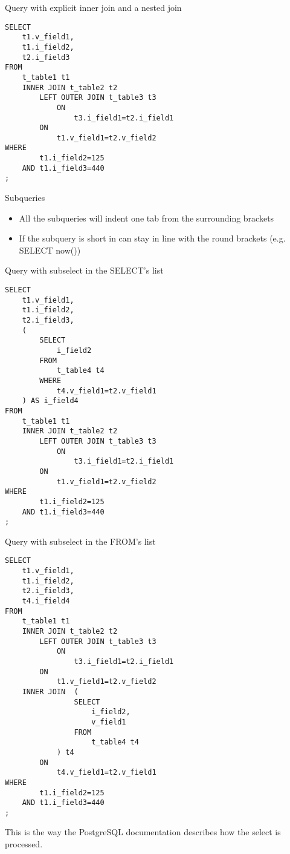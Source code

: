 Query with explicit inner join and a nested join
\begin{lstlisting}[style=pgsql]
SELECT 
	t1.v_field1,
	t1.i_field2,
	t2.i_field3 
FROM 
	t_table1 t1 
	INNER JOIN t_table2 t2
		LEFT OUTER JOIN t_table3 t3
			ON
				t3.i_field1=t2.i_field1
		ON
			t1.v_field1=t2.v_field2
WHERE 
		t1.i_field2=125
	AND	t1.i_field3=440
;
\end{lstlisting}

Subqueries
\begin{itemize}
 \item All the subqueries will indent one tab from the surrounding brackets
 \item If the subquery is short in can stay in line with the round brackets (e.g. SELECT now())
\end{itemize}


Query with subselect in the SELECT's list
\begin{lstlisting}[style=pgsql]
SELECT 
	t1.v_field1,
	t1.i_field2,
	t2.i_field3,
	(
		SELECT 
			i_field2
		FROM
			t_table4 t4
		WHERE
			t4.v_field1=t2.v_field1
	) AS i_field4
FROM 
	t_table1 t1 
	INNER JOIN t_table2 t2
		LEFT OUTER JOIN t_table3 t3
			ON
				t3.i_field1=t2.i_field1
		ON
			t1.v_field1=t2.v_field2
WHERE 
		t1.i_field2=125
	AND	t1.i_field3=440
;
\end{lstlisting}

Query with subselect in the FROM's list
\begin{lstlisting}[style=pgsql]
SELECT 
	t1.v_field1,
	t1.i_field2,
	t2.i_field3,
	t4.i_field4
FROM 
	t_table1 t1 
	INNER JOIN t_table2 t2
		LEFT OUTER JOIN t_table3 t3
			ON
				t3.i_field1=t2.i_field1
		ON
			t1.v_field1=t2.v_field2
	INNER JOIN 	(
				SELECT 
					i_field2,
					v_field1
				FROM
					t_table4 t4
			) t4
		ON
			t4.v_field1=t2.v_field1
WHERE 
		t1.i_field2=125
	AND	t1.i_field3=440
;
\end{lstlisting}




This is the way the PostgreSQL documentation describes how the select is processed.


